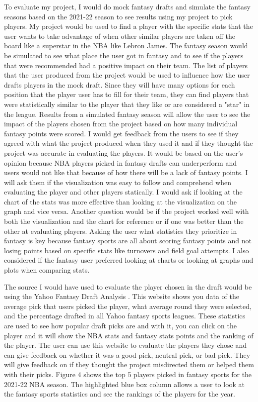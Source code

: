 \documentclass[10pt,twocolumn]{article}
\begin{document}
To evaluate my project, I would do mock fantasy drafts and simulate the fantasy seasons based on the 2021-22 season to see results using my project to pick players. My project would be used to find a player with the specific stats that the user wants to take advantage of when other similar players are taken off the board like a superstar in the NBA like Lebron James. The fantasy season would be simulated to see what place the user got in fantasy and to see if the players that were recommended had a positive impact on their team. The list of players that the user produced from the project would be used to influence how the user drafts players in the mock draft. Since they will have many options for each position that the player user has to fill for their team, they can find players that were statistically similar to the player that they like or are considered a "star" in the league. Results from a simulated fantasy season will allow the user to see the impact of the players chosen from the project based on how many individual fantasy points were scored. I would get feedback from the users to see if they agreed with what the project produced when they used it and if they thought the project was accurate in evaluating the players. It would be based on the user's opinion because NBA players picked in fantasy drafts can underperform and users would not like that because of how there will be a lack of fantasy points. I will ask them if the visualization was easy to follow and comprehend when evaluating the player and other players statically. I would ask if looking at the chart of the stats was more effective than looking at the visualization on the graph and vice versa. Another question would be if the project worked well with both the visualization and the chart for reference or if one was better than the other at evaluating players. Asking the user what statistics they prioritize in fantasy is key because fantasy sports are all about scoring fantasy points and not losing points based on specific stats like turnovers and field goal attempts. I also considered if the fantasy user preferred looking at charts or looking at graphs and plots when comparing stats.

The source I would have used to evaluate the player chosen in the draft would be using the Yahoo Fantasy Draft Analysis \cite{fantasy}. This website shows you data of the average pick that users picked the player, what average round they were selected, and the percentage drafted in all Yahoo fantasy sports leagues. These statistics are used to see how popular draft picks are and with it, you can click on the player and it will show the NBA stats and fantasy stats points and the ranking of the player. The user can use this website to evaluate the players they chose and can give feedback on whether it was a good pick, neutral pick, or bad pick. They will give feedback on if they thought the project misdirected them or helped them with their picks. Figure 4 shows the top 5 players picked in fantasy sports for the 2021-22 NBA season. The highlighted blue box column allows a user to look at the fantasy sports statistics and see the rankings of the players for the year. 
\end{document}
